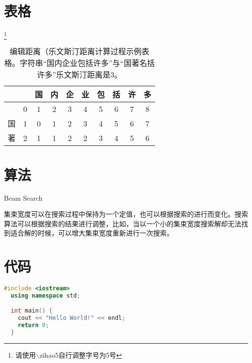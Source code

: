 \documentclass[winfonts, thesis]{njuthesis}
\begin{document}
\section{表格}\footnote{请使用$\backslash$zihao{5}自行调整字号为5号}

\begin{table}[htbp]
  \setlength{\belowcaptionskip}{7pt}
  \centering
  \begin{tabular}{|c|c|c|c|c|c|c|c|c|c|}
    \hline
       &   & 国 & 内 & 企 & 业 & 包 & 括 & 许 & 多 \\
    \hline
       & 0 & 1  & 2  & 3  & 4  & 5  & 6  & 7  & 8  \\
    \hline
    国 & 1 & 0  & 1  & 2  & 3  & 4  & 5  & 6  & 7  \\
    \hline
    著 & 2 & 1  & 1  & 2  & 2  & 3  & 4  & 5  & 6  \\
    \hline
  \end{tabular}
  \vspace{0.2cm}
  \caption{编辑距离（乐文斯汀距离计算过程示例表格。字符串``国内企业包括许多''与``国著名括许多''乐文斯汀距离是3。}\label{table:ld}
\end{table}


\section{算法}

\begin{algorithm}
  \caption{Beam Search}
  \label{alg:beam}
  \begin{algorithmic}[1]
    \ELSE
    \ENDIF
    \ENDWHILE
  \end{algorithmic}
\end{algorithm}

集束宽度可以在搜索过程中保持为一个定值，也可以根据搜索的进行而变化。搜索算法可以根据搜索的结果进行调整，比如，当以一个小的集束宽度搜索解却无法找到适合解的时候，可以增大集束宽度重新进行一次搜索。

\section{代码}

\begin{lstlisting}[language = c++, style=codeBase]
  #include <iostream>
  using namespace std;

  int main() {
    cout << "Hello World!" << endl;
    return 0;
  }
\end{lstlisting}
\end{document}
